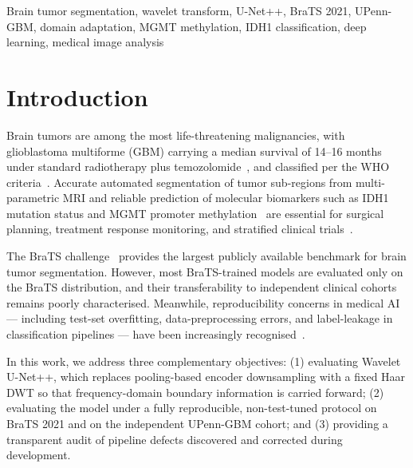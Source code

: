 \documentclass[conference]{IEEEtran}
\begin{document}
\begin{IEEEkeywords}
Brain tumor segmentation, wavelet transform, U-Net++, BraTS 2021, UPenn-GBM, domain adaptation, MGMT methylation, IDH1 classification, deep learning, medical image analysis
\end{IEEEkeywords}

\section{Introduction}

Brain tumors are among the most life-threatening malignancies, with glioblastoma multiforme (GBM) carrying a median survival of 14--16 months under standard radiotherapy plus temozolomide~\cite{stupp2005radiotherapy}, and classified per the WHO criteria~\cite{louis2016who}. Accurate automated segmentation of tumor sub-regions from multi-parametric MRI and reliable prediction of molecular biomarkers such as IDH1 mutation status and MGMT promoter methylation~\cite{hegi2005mgmt} are essential for surgical planning, treatment response monitoring, and stratified clinical trials~\cite{menze2015multimodal}.

The BraTS challenge~\cite{baid2021brats} provides the largest publicly available benchmark for brain tumor segmentation. However, most BraTS-trained models are evaluated only on the BraTS distribution, and their transferability to independent clinical cohorts remains poorly characterised. Meanwhile, reproducibility concerns in medical AI --- including test-set overfitting, data-preprocessing errors, and label-leakage in classification pipelines --- have been increasingly recognised~\cite{isensee2021nnu,varoquaux2022ml,heil2021reproducibility}.

In this work, we address three complementary objectives: (1) evaluating Wavelet U-Net++, which replaces pooling-based encoder downsampling with a fixed Haar DWT so that frequency-domain boundary information is carried forward; (2) evaluating the model under a fully reproducible, non-test-tuned protocol on BraTS 2021 and on the independent UPenn-GBM cohort; and (3) providing a transparent audit of pipeline defects discovered and corrected during development.
\end{document}
